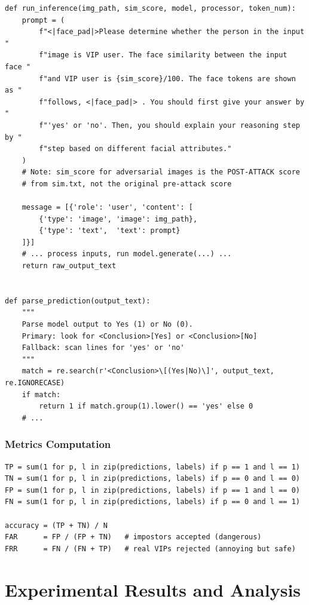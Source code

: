 \documentclass[12pt,a4paper]{article}
\begin{document}
\begin{lstlisting}[caption={Inference and prediction parsing}]
def run_inference(img_path, sim_score, model, processor, token_num):
    prompt = (
        f"<|face_pad|>Please determine whether the person in the input "
        f"image is VIP user. The face similarity between the input face "
        f"and VIP user is {sim_score}/100. The face tokens are shown as "
        f"follows, <|face_pad|> . You should first give your answer by "
        f"'yes' or 'no'. Then, you should explain your reasoning step by "
        f"step based on different facial attributes."
    )
    # Note: sim_score for adversarial images is the POST-ATTACK score
    # from sim.txt, not the original pre-attack score

    message = [{'role': 'user', 'content': [
        {'type': 'image', 'image': img_path},
        {'type': 'text',  'text': prompt}
    ]}]
    # ... process inputs, run model.generate(...) ...
    return raw_output_text


def parse_prediction(output_text):
    """
    Parse model output to Yes (1) or No (0).
    Primary: look for <Conclusion>[Yes] or <Conclusion>[No]
    Fallback: scan lines for 'yes' or 'no'
    """
    match = re.search(r'<Conclusion>\[(Yes|No)\]', output_text, re.IGNORECASE)
    if match:
        return 1 if match.group(1).lower() == 'yes' else 0
    # ...
\end{lstlisting}

\subsubsection{Metrics Computation}

\begin{lstlisting}[caption={Metrics computation in evaluate\_category()}]
TP = sum(1 for p, l in zip(predictions, labels) if p == 1 and l == 1)
TN = sum(1 for p, l in zip(predictions, labels) if p == 0 and l == 0)
FP = sum(1 for p, l in zip(predictions, labels) if p == 1 and l == 0)
FN = sum(1 for p, l in zip(predictions, labels) if p == 0 and l == 1)

accuracy = (TP + TN) / N
FAR      = FP / (FP + TN)   # impostors accepted (dangerous)
FRR      = FN / (FN + TP)   # real VIPs rejected (annoying but safe)
\end{lstlisting}

\section{Experimental Results and Analysis}
\end{document}
